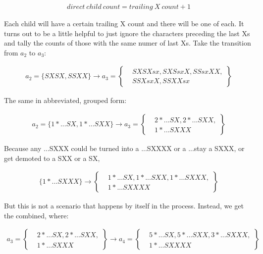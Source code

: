 \documentclass{article}
\begin{document}
\begin{align*}
  direct~child~count=trailing~X~count + 1
\end{align*}

Each child will have a certain trailing X count and there will be one of each.  It turns out to be a little helpful to just ignore the characters preceding the last Xs and tally the counts of those with the same numer of last Xs.  Take the transition from $a_2$ to $a_3$:

\begin{align*}
  a_2 = \{SXSX,SSXX\} \rightarrow a_3 =
  \left\{
    \begin{aligned}
      & SXSXsx, SXSsxX, SSsxXX, \\
      & SSXsxX, SSXXsx
    \end{aligned}
  \right\}
\end{align*}

The same in abbreviated, grouped form:

\begin{align*}
  a_2 = \{1 * ...SX,1 * ...SXX\} \rightarrow a_3 =
  \left\{
    \begin{aligned}
      & 2 * ...SX, 2 * ...SXX, \\
      & 1 * ...SXXX
    \end{aligned}
  \right\}
\end{align*}

Because any ...SXXX could be turned into a ...SXXXX or a ...stay a SXXX, or get demoted to a SXX or a SX,

\begin{align*}
  \{1 * ...SXXX\} \rightarrow
  \left\{
    \begin{aligned}
      & 1 * ...SX, 1 * ...SXX, 1 * ...SXXX, \\
      & 1 * ...SXXXX
    \end{aligned}
  \right\}
\end{align*}

But this is not a scenario that happens by itself in the process.  Instead, we get the combined, where:



\begin{align*}
  a_3 = 
  \left\{
    \begin{aligned}
      & 2 * ...SX, 2 * ...SXX, \\
      & 1 * ...SXXX
    \end{aligned}
  \right\} \rightarrow a_4 =
  \left\{
    \begin{aligned}
      & 5 * ...SX, 5 * ...SXX, 3 * ...SXXX, \\
      & 1 * ...SXXXX
    \end{aligned}
  \right\}
\end{align*}
\end{document}
